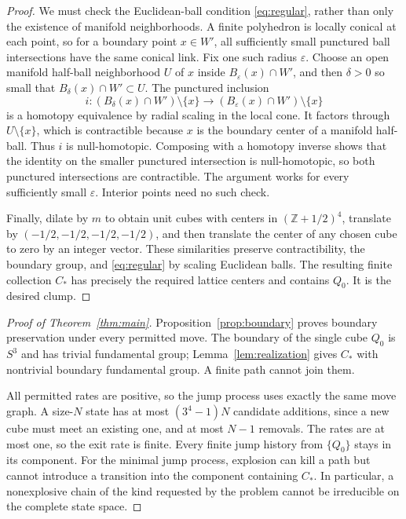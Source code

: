 \documentclass[11pt]{article}
\theoremstyle{remark}
\newcommand{\Z}{\mathbb Z}
\begin{document}
\begin{proof}
We must check the Euclidean-ball condition \eqref{eq:regular}, rather
than only the existence of manifold neighborhoods. A finite polyhedron
is locally conical at each point, so for a boundary point $x\in W'$,
all sufficiently small punctured ball intersections have the same
conical link. Fix one such radius $\varepsilon$. Choose an open manifold
half-ball neighborhood $U$ of $x$ inside $B_\varepsilon(x)\cap W'$, and
then $\delta>0$ so small that $B_\delta(x)\cap W'\subset U$.
The punctured inclusion
\[
 i:(B_\delta(x)\cap W')\setminus\{x\}
 \longrightarrow (B_\varepsilon(x)\cap W')\setminus\{x\}
\]
is a homotopy equivalence by radial scaling in the local cone.
It factors through $U\setminus\{x\}$, which is contractible because
$x$ is the boundary center of a manifold half-ball. Thus $i$ is
null-homotopic. Composing with a homotopy inverse shows that the identity
on the smaller punctured intersection is null-homotopic, so both
punctured intersections are contractible. The argument works for every
sufficiently small $\varepsilon$. Interior points need no such check.

Finally, dilate by $m$ to obtain unit cubes with centers in
$(\Z+1/2)^4$, translate by $(-1/2,-1/2,-1/2,-1/2)$, and then translate
the center of any chosen cube to zero by an integer vector. These
similarities preserve contractibility, the boundary group, and
\eqref{eq:regular} by scaling Euclidean balls. The resulting finite
collection $C_*$ has precisely the required lattice centers and contains
$Q_0$. It is the desired clump.
\end{proof}

\begin{proof}[Proof of Theorem~\ref{thm:main}]
Proposition~\ref{prop:boundary} proves boundary preservation under every
permitted move. The boundary of the single cube $Q_0$ is $S^3$ and has
trivial fundamental group; Lemma~\ref{lem:realization} gives $C_*$ with
nontrivial boundary fundamental group. A finite path cannot join them.

All permitted rates are positive, so the jump process uses exactly the
same move graph. A size-$N$ state has at most $(3^4-1)N$ candidate
additions, since a new cube must meet an existing one, and at most $N-1$
removals. The rates are at most one, so the exit rate is finite.
Every finite jump history from $\{Q_0\}$ stays in its component.
For the minimal jump process, explosion can kill a path but cannot
introduce a transition into the component containing $C_*$. In
particular, a nonexplosive chain of the kind requested by the problem
cannot be irreducible on the complete state space.
\end{proof}
\end{document}
